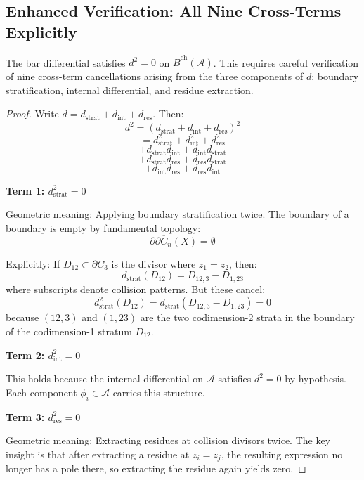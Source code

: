 \subsection{Enhanced Verification: All Nine Cross-Terms Explicitly}

\begin{theorem}\label{thm:d-squared-complete}
The bar differential satisfies $d^2 = 0$ on $\bar{B}^{\text{ch}}(\mathcal{A})$. 
This requires careful verification of nine cross-term cancellations arising from 
the three components of $d$: boundary stratification, internal differential, and 
residue extraction.
\end{theorem}

\begin{proof}
Write $d = d_{\text{strat}} + d_{\text{int}} + d_{\text{res}}$. Then:
$$d^2 = (d_{\text{strat}} + d_{\text{int}} + d_{\text{res}})^2$$
$$= d_{\text{strat}}^2 + d_{\text{int}}^2 + d_{\text{res}}^2$$
$$+ d_{\text{strat}} d_{\text{int}} + d_{\text{int}} d_{\text{strat}}$$
$$+ d_{\text{strat}} d_{\text{res}} + d_{\text{res}} d_{\text{strat}}$$
$$+ d_{\text{int}} d_{\text{res}} + d_{\text{res}} d_{\text{int}}$$

\textbf{Term 1: $d_{\text{strat}}^2 = 0$}

Geometric meaning: Applying boundary stratification twice. The boundary of a 
boundary is empty by fundamental topology:
$$\partial \partial \overline{C}_n(X) = \emptyset$$

Explicitly: If $D_{12} \subset \partial \overline{C}_3$ is the divisor where 
$z_1 = z_2$, then:
$$d_{\text{strat}}(D_{12}) = D_{12,3} - D_{1,23}$$
where subscripts denote collision patterns. But these cancel:
$$d_{\text{strat}}^2(D_{12}) = d_{\text{strat}}(D_{12,3} - D_{1,23}) = 0$$
because $(12,3)$ and $(1,23)$ are the two codimension-2 strata in the boundary 
of the codimension-1 stratum $D_{12}$.

\textbf{Term 2: $d_{\text{int}}^2 = 0$}

This holds because the internal differential on $\mathcal{A}$ satisfies $d^2 = 0$ 
by hypothesis. Each component $\phi_i \in \mathcal{A}$ carries this structure.

\textbf{Term 3: $d_{\text{res}}^2 = 0$}

Geometric meaning: Extracting residues at collision divisors twice. The key insight 
is that after extracting a residue at $z_i = z_j$, the resulting expression no 
longer has a pole there, so extracting the residue again yields zero.


\end{proof}
